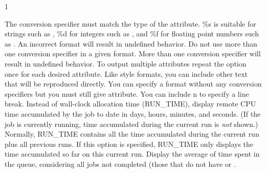 \begin{ManPage}{\label{man-condor-q}}{1}
\begin{Options}
{    The conversion specifier must match the type of the
    attribute.
    \%s is suitable for strings such as ,
    \%d for integers such as ,
    and \%f for floating point numbers such as
    .  An incorrect format
    will result in undefined behavior.
    Do not use more than one conversion specifier in a given
    format.  More than one conversion specifier will result
    in undefined behavior.  To output multiple attributes
    repeat the  option once for each desired
    attribute.
    Like {} style formats, you can include other
    text that will be reproduced directly.   You can specify
    a format without any conversion specifiers but you must
    still give attribute.
    You can include \Bs n to specify a line break. }
   {Instead of wall-clock allocation time (RUN\_TIME), 
    display remote CPU time accumulated by the job to date in days,
    hours, minutes, and seconds.  (If the job is currently running, time
    accumulated during the current run is \emph{not} shown.)}
   {Normally, RUN\_TIME contains all the time
    accumulated during the current run plus all previous runs.  If this
    option is specified, RUN\_TIME only displays the time accumulated so
    far on this current run.}
   {Display the average of time spent in the
    queue, considering all jobs not completed (those that do not have
     or .  }
\end{Options}


\end{ManPage}
